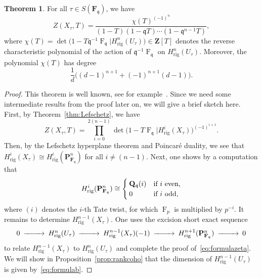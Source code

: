 \documentclass[a4paper,11pt]{article}
\numberwithin{equation}{section}
\newcommand{\ZZ}{\mathbf{Z}} %
\newcommand{\QQ}{\mathbf{Q}} %
\newcommand{\FF}{\mathbf{F}} %
\DeclareMathOperator{\Frob}{F}           %
\providecommand{\Hrig}{H_{\text{rig}}}  %
\theoremstyle{definition}
\newtheorem{thm}{Theorem}[section]
\begin{document}
\begin{thm} \label{thm:hypersurface} 
For all $\tau \in S(\FF_{\mathfrak{q}})$, we have
\begin{equation} \label{eq:formulazeta}
Z(X_{\tau},T) = \frac{\chi(T)^{(-1)^n}}{(1 - T) (1 - \mathfrak{q}T) \dotsm (1 - \mathfrak{q}^{n-1}T)},
\end{equation}
where 
$\chi(T) = \det \bigl( 1 - T \mathfrak{q}^{-1} \Frob_{\mathfrak{q}} | \Hrig^n(U_{\tau}) \bigr) \in \ZZ[T]$
denotes the reverse characteristic polynomial of the action of 
$\mathfrak{q}^{-1} \Frob_{\mathfrak{q}}$ on $\Hrig^n(U_{\tau})$. 
Moreover, the polynomial $\chi(T)$ has degree 
\begin{equation} \label{eq:formulab}
\frac{1}{d} \bigl((d-1)^{n+1} + (-1)^{n+1}(d-1) \bigr).
\end{equation}
\end{thm}

\begin{proof}
This theorem is well known, see for example~\citep{AbbottKedlayaRoe2006}. 
Since we need some intermediate results from the proof later on, we will 
give a brief sketch here. First, by Theorem~\ref{thm:Lefschetz}, we have 
\[
Z(X_{\tau},T) = \prod_{i=0}^{2(n-1)} 
    \det\bigl(1- T \Frob_{\mathfrak{q}} | \Hrig^i(X_{\tau})\bigr)^{(-1)^{i+1}}.
\]
Then, by the Lefschetz hyperplane theorem and Poincar\'e duality, we see 
that $\Hrig^i(X_{\tau}) \cong \Hrig^i(\mathbf{P}^n_{\FF_{\mathfrak{q}}})$ 
for all $i \neq (n-1)$. Next, one shows by a computation that
\begin{equation} \label{eqn:projcoho}
\Hrig^i(\mathbf{P}^n_{\FF_{\mathfrak{q}}}) 
\cong 
\begin{cases}
\QQ_{\mathfrak{q}}(i) &\mbox{if $i$ even,} \\
$0$ &\mbox{if $i$ odd,} 
\end{cases} 
\end{equation}
where $(i)$ denotes the $i$-th Tate twist, for which $\Frob_p$ is multiplied 
by $p^{-i}$. It remains to determine $\Hrig^{n-1}(X_{\tau})$. One uses the 
excision short exact sequence
\begin{equation} \label{eqn:excision}
\begin{CD}
0 @>>> \Hrig^{n}(U_{\tau}) @>>> \Hrig^{n-1}(X_{\tau})(-1) @>>> \Hrig^{n+1}(\mathbf{P}^n_{\FF_{\mathfrak{q}}}) @>>> 0
\end{CD} 
\end{equation}
to relate $\Hrig^{n-1}(X_{\tau})$ to $\Hrig^{n}(U_{\tau})$ and complete 
the proof of~\eqref{eq:formulazeta}. We will show in Proposition~\ref{prop:rankcoho}
that the dimension of $\Hrig^{n-1}(U_{\tau})$ is given by~\eqref{eq:formulab}.
\end{proof}
\end{document}
